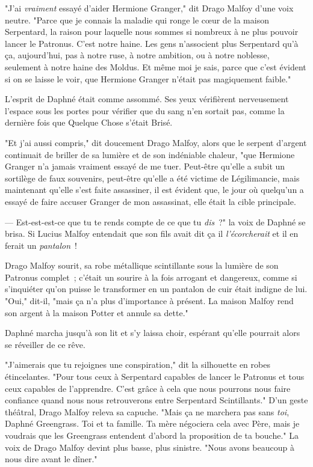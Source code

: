 "J'ai \emph{vraiment} essayé d'aider Hermione Granger," dit Drago Malfoy d'une voix neutre. "Parce que je connais la maladie qui ronge le cœur de la maison Serpentard, la raison pour laquelle nous sommes si nombreux à ne plus pouvoir lancer le Patronus. C'est notre haine. Les gens n'associent plus Serpentard qu'à ça, aujourd'hui, pas à notre ruse, à notre ambition, ou à notre noblesse, seulement à notre haine des Moldus. Et même moi je sais, parce que c'est évident si on se laisse le voir, que Hermione Granger n'était pas magiquement faible."

L'esprit de Daphné était comme assommé. Ses yeux vérifièrent nerveusement l'espace sous les portes pour vérifier que du sang n'en sortait pas, comme la dernière fois que Quelque Chose s'était Brisé.

"Et j'ai aussi compris," dit doucement Drago Malfoy, alors que le serpent d'argent continuait de briller de sa lumière et de son indéniable chaleur, "que Hermione Granger n'a jamais vraiment essayé de me tuer. Peut-être qu'elle a subit un sortilège de faux souvenirs, peut-être qu'elle a été victime de Légilimancie, mais maintenant qu'elle s'est faite assassiner, il est évident que, le jour où quelqu'un a essayé de faire accuser Granger de mon assassinat, elle était la cible principale.

--- Est-est-est-ce que tu te rends compte de ce que tu \emph{dis}~?" la voix de Daphné se brisa. Si Lucius Malfoy entendait que son fils avait dit ça il \emph{l'écorcherait} et il en ferait un \emph{pantalon}~!

Drago Malfoy sourit, sa robe métallique scintillante sous la lumière de son Patronus complet~; c'était un sourire à la fois arrogant et dangereux, comme si s'inquiéter qu'on puisse le transformer en un pantalon de cuir était indigne de lui. "Oui," dit-il, "mais ça n'a plus d'importance à présent. La maison Malfoy rend son argent à la maison Potter et annule sa dette."

Daphné marcha jusqu'à son lit et s'y laissa choir, espérant qu'elle pourrait alors se réveiller de ce rêve.

"J'aimerais que tu rejoignes une conspiration," dit la silhouette en robes étincelantes. "Pour tous ceux à Serpentard capables de lancer le Patronus et tous ceux capables de l'apprendre. C'est grâce à cela que nous pourrons nous faire confiance quand nous nous retrouverons entre Serpentard Scintillants." D'un geste théâtral, Drago Malfoy releva sa capuche. "Mais ça ne marchera pas sans \emph{toi}, Daphné Greengrass. Toi et ta famille. Ta mère négociera cela avec Père, mais je voudrais que les Greengrass entendent d'abord la proposition de ta bouche." La voix de Drago Malfoy devint plus basse, plus sinistre. "Nous avons beaucoup à nous dire avant le dîner."

